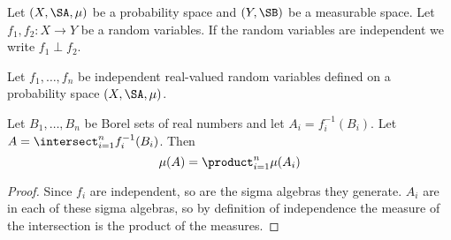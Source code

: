 Let $(X, \SA, \mu)$ be a probability
space and $(Y, \SB)$ be a measurable
space.
Let $f_1,f_2: X \to Y$ be a random variables.
If the random variables are independent
we write $f_1 \perp f_2$.


\begin{prop}
Let $f_1, \dots, f_n$
be independent real-valued
random variables
defined on a probability
space $(X, \SA, \mu)$.

Let $B_1, \dots, B_n$
be Borel sets of
real numbers
and let $A_i = f_i^{-1}(B_i)$.
Let $A = \intersect_{i = 1}^{n} f_i^{-1}(B_i)$.
Then
\[
  \mu(A)
  = \product_{i = 1}^{n} \mu(A_i)
\]
  \begin{proof}
    Since $f_i$ are independent, so
    are the sigma algebras they generate.
    $A_i$ are in each of these sigma
    algebras, so by definition of
    independence the measure of
    the intersection
    is the product of the measures.
  \end{proof}
\end{prop}
\strats
